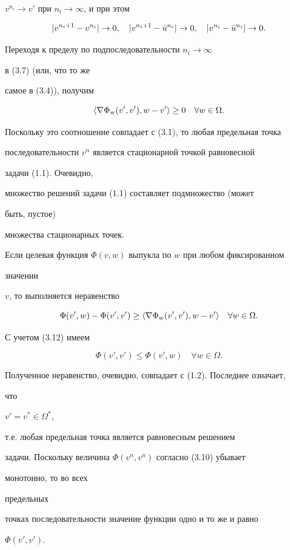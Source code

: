 \begin{pf}
$v^{n_i}\to v'$ при $n_i\to\infty$, и при этом


$$


|v^{n_i+1}-v^{n_i}|\to 0,\quad


|v^{n_i+1}-\Bar u^{n_i}|\to 0,\quad


|v^{n_i}-\Bar u^{n_i}|\to 0.


$$





Переходя к пределу по подпоследовательности $n_i\to\infty$


в (3.7) (или, что то же


самое в (3.4)), получим


\begin{equation}


\la\nabla\Phi_w(v',v'),w-v'\ra\ge 0\quad \forall w\in \Omega.


\end{equation}


Поскольку это соотношение совпадает с (3.1), то любая предельная точка


последовательности $v^n$ является стационарной точкой равновесной


задачи (1.1). Очевидно,


множество решений задачи (1.1) составляет подмножество (может


быть, пустое)


множества стационарных точек.





Если целевая функция $\Phi(v,w)$ выпукла по $w$ при любом фиксированном


значении


$v$, то выполняется неравенство


\begin{equation}


\Phi(v',w)-\Phi(v',v')\ge \la\nabla\Phi_w(v',v'),w-v'\ra


\quad \forall w\in \Omega.


\end{equation}


С учетом (3.12) имеем


$$


\Phi(v',v')\le \Phi(v',w)\quad \forall w\in \Omega.


$$


Полученное неравенство, очевидно, совпадает с (1.2). Последнее означает,


что


$v'=v^*\in\Omega^*$,


т.е. любая предельная точка является равновесным решением


задачи. Поскольку величина $\Phi(v^n,v^n)$ согласно (3.10) убывает


монотонно, то во всех


предельных


точках последовательности значение функции одно и то же и равно


$\Phi(v',v')$.


\end{pf}





